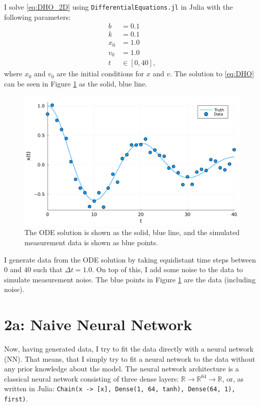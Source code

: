 \documentclass[10pt,a4paper]{article}
\begin{document}
I solve \eqref{eq:DHO_2D} using \texttt{DifferentialEquations.jl} in Julia with the following parameters:
\begin{equation}
    \begin{split}
        b &= 0.1 \\
        k &= 0.1 \\
        x_0 &= 1.0 \\
        v_0 &= 1.0 \\
        t &\in [0, 40],
    \end{split}
\end{equation}
where $x_0$ and $v_0$ are the initial conditions for $x$ and $v$.
The solution to \eqref{eq:DHO} can be seen in Figure \ref{fig:DHO} as the solid, blue line.

\begin{figure}[H]
    \includegraphics[width=\linewidth]{truth.pdf}
    \caption{The ODE solution is shown as the solid, blue line, and the simulated measurement data is shown as blue points.}
    \label{fig:DHO}
\end{figure}

I generate data from the ODE solution by taking equidistant time steps between $0$ and $40$ such that $\Delta t = 1.0$.
On top of this, I add some noise to the data to simulate measurement noise.
The blue points in Figure \ref{fig:DHO} are the data (including noise).

\section*{2a: Naive Neural Network}

Now, having generated data, I try to fit the data directly with a neural network (NN).
That means, that I simply try to fit a neural network to the data without any prior knowledge about the model.
The neural network architecture is a classical neural network consisting of three dense layers:
${\mathbb{R} \rightarrow \mathbb{R}^{64} \rightarrow \mathbb{R}}$, or, as written in Julia:
\mbox{\texttt{Chain(x -> [x], Dense(1, 64, tanh), Dense(64, 1), first)}}.
\end{document}
